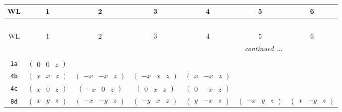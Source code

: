 \documentclass[fleqn,9pt,landscape]{jsarticle}
\begin{document}
\begin{center}
\renewcommand{\arraystretch}{1.2}
\begin{longtable}{ccccccc}
 \hline \hline
WL & 1 & 2 & 3 & 4 & 5 & 6 \\ \hline \endfirsthead

\multicolumn{6}{l}{\tablename\ \thetable{}} \\
 \hline \hline
WL & 1 & 2 & 3 & 4 & 5 & 6 \\ \hline \endhead

 \hline \hline
\multicolumn{6}{r}{\footnotesize\it continued ...} \\ \endfoot

 \hline \hline
\multicolumn{6}{r}{} \\ \endlastfoot

{\tt 1a} & $ \begin{pmatrix} 0 & 0 & z \end{pmatrix} $ & $  $ & $  $ & $  $ & $  $ & $  $ \\ \hline
{\tt 4b} & $ \begin{pmatrix} x & x & z \end{pmatrix} $ & $ \begin{pmatrix} - x & - x & z \end{pmatrix} $ & $ \begin{pmatrix} - x & x & z \end{pmatrix} $ & $ \begin{pmatrix} x & - x & z \end{pmatrix} $ & $  $ & $  $ \\ \hline
{\tt 4c} & $ \begin{pmatrix} x & 0 & z \end{pmatrix} $ & $ \begin{pmatrix} - x & 0 & z \end{pmatrix} $ & $ \begin{pmatrix} 0 & x & z \end{pmatrix} $ & $ \begin{pmatrix} 0 & - x & z \end{pmatrix} $ & $  $ & $  $ \\ \hline
{\tt 8d} & $ \begin{pmatrix} x & y & z \end{pmatrix} $ & $ \begin{pmatrix} - x & - y & z \end{pmatrix} $ & $ \begin{pmatrix} - y & x & z \end{pmatrix} $ & $ \begin{pmatrix} y & - x & z \end{pmatrix} $ & $ \begin{pmatrix} - x & y & z \end{pmatrix} $ & $ \begin{pmatrix} x & - y & z \end{pmatrix} $ \\

\end{longtable}
\end{center}
\end{document}
